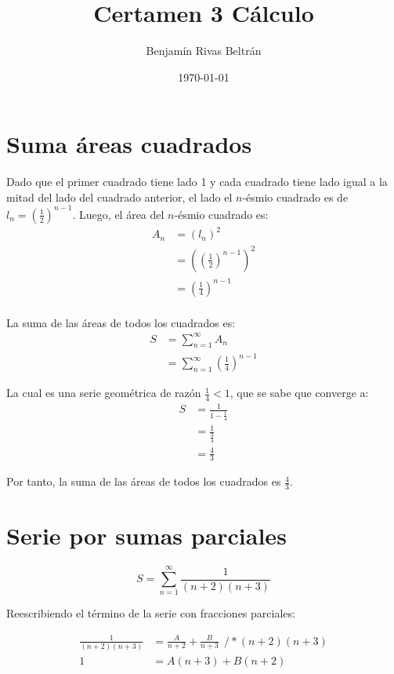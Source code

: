 \documentclass{article}
\title{Certamen 3 Cálculo}
\author{Benjamín Rivas Beltrán}
\date{\today}
\begin{document}
\maketitle

\section{Suma áreas cuadrados}

Dado que el primer cuadrado tiene lado 1 y cada cuadrado tiene lado igual a la mitad del lado del cuadrado anterior, el lado el $n$-ésmio cuadrado es de $l_n = ( \frac{1}{2})^{n - 1}$. Luego, el área del $n$-ésmio cuadrado es:
\begin{align*}
A_n &= (l_n)^2 \\ 
&= \left(\left(\frac{1}{2}\right)^{n - 1}\right)^2 \\
&= \left(\frac{1}{4}\right)^{n - 1} \\ 
\end{align*}

La suma de las áreas de todos los cuadrados es:
\begin{align*}
S &= \sum_{n = 1}^{\infty} A_n \\
&= \sum_{n = 1}^{\infty} \left(\frac{1}{4}\right)^{n - 1}
\end{align*}

La cual es una serie geométrica de razón $\frac{1}{4} < 1$, que se sabe que converge a:
\begin{align*}
S &= \frac{1}{1 - \frac{1}{4}} \\
&= \frac{1}{\frac{3}{4}} \\
&= \boxed{\frac{4}{3}}
\end{align*}

Por tanto, la suma de las áreas de todos los cuadrados es $\frac{4}{3}$.

\section{Serie por sumas parciales}

\[
S = \sum_{n = 1}^{\infty} \frac{1}{(n + 2)(n + 3)}
\]

Reescribiendo el término de la serie con fracciones parciales:

\begin{align*}
\frac{1}{(n + 2)(n + 3)} &= \frac{A}{n + 2} + \frac{B}{n + 3}     \ \ / * (n + 2)(n + 3) \\
1 &= A(n + 3) + B(n + 2)
\end{align*}
\end{document}
